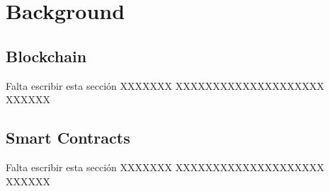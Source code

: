 \section{Background}
\label{sec:background}

\subsection{Blockchain}
Falta escribir esta sección XXXXXXX
XXXXXXXXXXXXXXXXXXXX
XXXXXX

\subsection{Smart Contracts}
Falta escribir esta sección XXXXXXX
XXXXXXXXXXXXXXXXXXXX
XXXXXX




